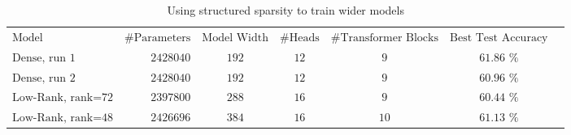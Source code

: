 \begin{table}[h!]
\centering
\tiny
\caption{Using structured sparsity to train wider models}
\label{tab:wider-models}
\begin{tabular}{lrccccl}
$\text{Model}$ & $\text{\# Parameters}$ & $\text{Model Width}$ & $\text{\# Heads}$ & $\text{\# Transformer Blocks}$ & $\text{Best Test Accuracy}$\\
$\text{Dense, run 1}$ & $2428040$ & $192$ & $12$ & $9$ & $\text{61.86 \%}$\\
$\text{Dense, run 2}$ & $2428040$ & $192$ & $12$ & $9$ & $\text{60.96 \%}$\\
$\text{Low-Rank, rank=72}$ & $2397800$ & $288$ & $16$ & $9$ & $\text{60.44 \%}$\\
$\text{Low-Rank, rank=48}$ & $2426696$ & $384$ & $16$ & $10$ & $\text{61.13 \%}$\\
\end{tabular}

\end{table}
